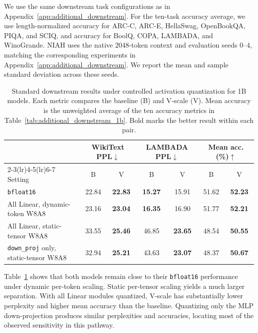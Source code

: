 \documentclass{article}
\theoremstyle{plain}
\theoremstyle{definition}
\theoremstyle{remark}
\begin{document}
We use the same downstream task configurations as in Appendix~\ref{app:additional_downstream}. For the ten-task accuracy average, we use length-normalized accuracy for ARC-C, ARC-E, HellaSwag, OpenBookQA, PIQA, and SCIQ, and accuracy for BoolQ, COPA, LAMBADA, and WinoGrande. NIAH uses the native 2048-token context and evaluation seeds $0$--$4$, matching the corresponding experiments in Appendix~\ref{app:additional_downstream}. We report the mean and sample standard deviation across these seeds.

\begin{table}[ht]
    \centering
    \caption{
    Standard downstream results under controlled activation quantization for 1B models. Each metric compares the baseline (B) and V-scale (V). Mean accuracy is the unweighted average of the ten accuracy metrics in Table~\ref{tab:additional_downstream_1b}. Bold marks the better result within each pair.
    }\label{tab:activation_quantization_standard}
    \setlength\tabcolsep{5pt}
    \begin{tabular}{lcccccc}
        \toprule
        & \multicolumn{2}{c}{WikiText PPL$\downarrow$}
        & \multicolumn{2}{c}{LAMBADA PPL$\downarrow$}
        & \multicolumn{2}{c}{Mean acc. (\%)$\uparrow$} \\
        \cmidrule(lr){2-3}\cmidrule(lr){4-5}\cmidrule(lr){6-7}
        Setting & B & V & B & V & B & V \\
        \midrule
        \texttt{bfloat16} & 22.84 & \textbf{22.83} & \textbf{15.27} & 15.91 & 51.62 & \textbf{52.23} \\
        All Linear, dynamic-token W8A8 & 23.16 & \textbf{23.04} & \textbf{16.35} & 16.90 & 51.77 & \textbf{52.21} \\
        All Linear, static-tensor W8A8 & 33.55 & \textbf{25.46} & 46.85 & \textbf{23.65} & 48.54 & \textbf{50.55} \\
        \texttt{down\_proj} only, static-tensor W8A8 & 32.94 & \textbf{25.21} & 43.63 & \textbf{23.07} & 48.37 & \textbf{50.67} \\
        \bottomrule
    \end{tabular}
\end{table}

Table~\ref{tab:activation_quantization_standard} shows that both models remain close to their \texttt{bfloat16} performance under dynamic per-token scaling. Static per-tensor scaling yields a much larger separation. With all Linear modules quantized, V-scale has substantially lower perplexity and higher mean accuracy than the baseline. Quantizing only the MLP down-projection produces similar perplexities and accuracies, locating most of the observed sensitivity in this pathway.
\end{document}
